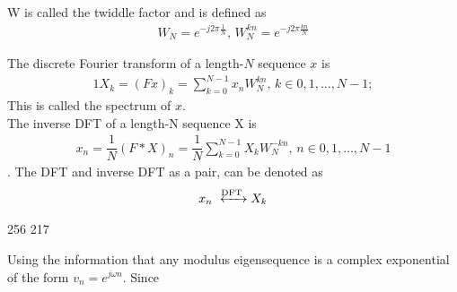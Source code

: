 W is called the twiddle factor and is defined as 
\begin{align*}
	W_N = e^{-j 2 \pi\frac{1}{N}}, \, W_N^{kn} = e^{-j 2 \pi\frac{kn}{N}}
\end{align*}

\begin{definition}
The discrete Fourier transform of a length-$N$ sequence $x$ is 
\begin{align*}1
	X_k = (Fx)_k = \sum_{k=0}^{N-1} x_n W_N^{kn}, \, k\in {0, 1, \dots, N-1};
\end{align*}
This is called the spectrum of $x$.\\
The inverse DFT of a length-N sequence X is
\begin{align*}
	x_n = \dfrac{1}{N}(F*X)_n = \dfrac{1}{N}\sum_{k=0}^{N-1} X_k W_N^{-kn}, \, n \in {0, 1, \dots, N-1}
\end{align*}
.
The DFT and inverse DFT as a pair, can be denoted as 
\begin{align*}
	x_n \xleftrightarrow{\text{DFT}} X_k
\end{align*}
\end{definition} 
\cite{FSP}



256 217

Using the information that any modulus eigensequence is a complex exponential of the form $v_n = e^{j\omega n}$.
Since 


